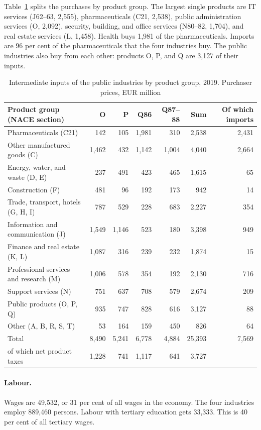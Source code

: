 \documentclass[11pt,a4paper]{article}
\begin{document}
Table~\ref{tab:inputs} splits the purchases by product group.
The largest single products are IT services (J62--63, 2,555), pharmaceuticals (C21, 2,538), public administration services (O, 2,092), security, building, and office services (N80--82, 1,704), and real estate services (L, 1,458).
Health buys 1,981 of the pharmaceuticals. Imports are 96 per cent of the pharmaceuticals that the four industries buy.
The public industries also buy from each other: products O, P, and Q are 3,127 of their inputs.

\begin{table}[!htbp]
\centering
\small
\caption{Intermediate inputs of the public industries by product group, 2019. Purchaser prices, EUR million}
\label{tab:inputs}
\begin{tabular}{@{}lrrrrrr@{}}
\toprule
Product group (NACE section) & O & P & Q86 & Q87--88 & Sum & Of which imports \\
\midrule
Pharmaceuticals (C21) & 142 & 105 & 1,981 & 310 & 2,538 & 2,431 \\
Other manufactured goods (C) & 1,462 & 432 & 1,142 & 1,004 & 4,040 & 2,664 \\
Energy, water, and waste (D, E) & 237 & 491 & 423 & 465 & 1,615 & 65 \\
Construction (F) & 481 & 96 & 192 & 173 & 942 & 14 \\
Trade, transport, hotels (G, H, I) & 787 & 529 & 228 & 683 & 2,227 & 354 \\
Information and communication (J) & 1,549 & 1,146 & 523 & 180 & 3,398 & 949 \\
Finance and real estate (K, L) & 1,087 & 316 & 239 & 232 & 1,874 & 15 \\
Professional services and research (M) & 1,006 & 578 & 354 & 192 & 2,130 & 716 \\
Support services (N) & 751 & 637 & 708 & 579 & 2,674 & 209 \\
Public products (O, P, Q) & 935 & 747 & 828 & 616 & 3,127 & 88 \\
Other (A, B, R, S, T) & 53 & 164 & 159 & 450 & 826 & 64 \\
\midrule
Total & 8,490 & 5,241 & 6,778 & 4,884 & 25,393 & 7,569 \\
\quad of which net product taxes & 1,228 & 741 & 1,117 & 641 & 3,727 & \\
\bottomrule
\end{tabular}
\end{table}

\paragraph{Labour.}
Wages are 49,532, or 31 per cent of all wages in the economy. The four industries employ 889,460 persons.
Labour with tertiary education gets 33,333. This is 40 per cent of all tertiary wages.
\end{document}
